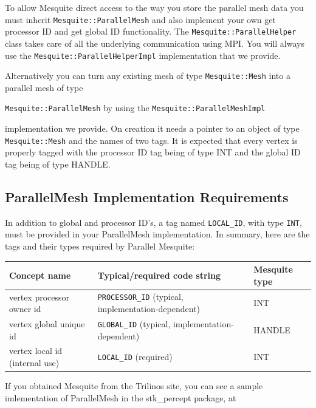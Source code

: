 To allow Mesquite direct access to the way you store the parallel mesh data you must inherit \texttt{Mesquite::ParallelMesh} and also implement your own get processor ID and get global ID functionality. The \texttt{Mesquite::ParallelHelper} class takes care of all the underlying communication using MPI. You will always use the \texttt{Mesquite::ParallelHelperImpl} implementation that we provide.

Alternatively you can turn any existing mesh of type \texttt{Mesquite::Mesh} into a parallel mesh of type\vspace{-5pt} \begin{center}
\texttt{Mesquite::ParallelMesh} by using the \texttt{Mesquite::ParallelMeshImpl} 
\end{center} \vspace{-5 pt}implementation we provide. On creation it needs a pointer to an object of type \texttt{Mesquite::Mesh} and the names of two tags. It is expected that every vertex is properly tagged with the processor ID tag being of type INT and the global ID tag being of type HANDLE.


\subsection{ParallelMesh Implementation Requirements}

In addition to global and processor ID's, a tag named \texttt{LOCAL\_ID}, with type \texttt{INT}, must be provided in
your ParallelMesh implementation.  In summary, here are the tags and
their types required by Parallel Mesquite:

\begin{tabular}{ | l | l | l | }
  \hline                        
  Concept name & Typical/required code string &  Mesquite type \\
\hline
 vertex processor owner id & \texttt{PROCESSOR\_ID} (typical, implementation-dependent) & INT \\
 vertex global unique id & \texttt{GLOBAL\_ID} (typical,  implementation-dependent) & HANDLE \\
 vertex local id (internal use) & \texttt{LOCAL\_ID} (required) & INT \\
  \hline  
\end{tabular}

If you obtained Mesquite from the Trilinos site, you can see a sample
imlementation of ParallelMesh in the stk\_percept package, at

